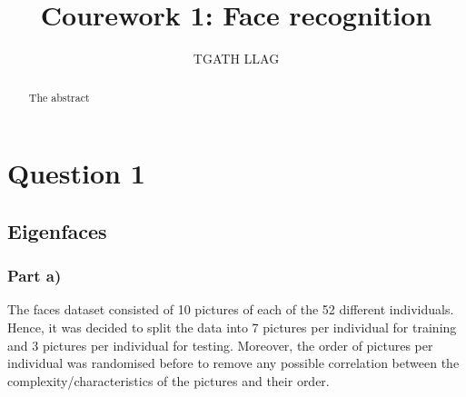 \documentclass[10pt,technote]{IEEEtran}
\title{Courework 1: Face recognition }
\author{TGATH LLAG}
\begin{document}
\maketitle
\begin{abstract}
The abstract
\end{abstract}

\section{Question 1}
\subsection{Eigenfaces}
\subsubsection{Part a)}
The faces dataset consisted of 10 pictures of each of the 52 different individuals. Hence, it was decided to split the data into 7 pictures per individual for training and 3 pictures per individual for testing. Moreover, the order of pictures per individual was randomised before to remove any possible correlation between the complexity/characteristics of the pictures and their order.





%
%
\end{document}

